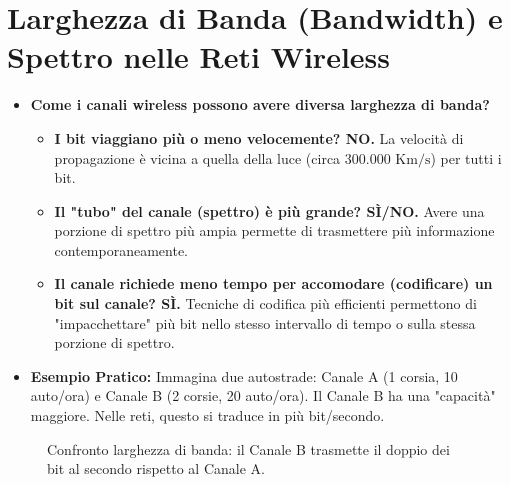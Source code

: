\section{Larghezza di Banda (Bandwidth) e Spettro nelle Reti Wireless}

\begin{itemize}
    \item \textbf{Come i canali wireless possono avere diversa larghezza di banda?}
    \begin{itemize}
        \item \textbf{I bit viaggiano più o meno velocemente? NO.} La velocità di propagazione è vicina a quella della luce (circa $300.000 \text{ Km/s}$) per tutti i bit.
        \item \textbf{Il "tubo" del canale (spettro) è più grande? SÌ/NO.} Avere una porzione di spettro più ampia permette di trasmettere più informazione contemporaneamente.
        \item \textbf{Il canale richiede meno tempo per accomodare (codificare) un bit sul canale? SÌ.} Tecniche di codifica più efficienti permettono di "impacchettare" più bit nello stesso intervallo di tempo o sulla stessa porzione di spettro.
    \end{itemize}
    \item \textbf{Esempio Pratico:}
    Immagina due autostrade: Canale A (1 corsia, 10 auto/ora) e Canale B (2 corsie, 20 auto/ora). Il Canale B ha una "capacità" maggiore. Nelle reti, questo si traduce in più bit/secondo.
\end{itemize}

\begin{figure}[H]
\centering
{}
\caption{Confronto larghezza di banda: il Canale B trasmette il doppio dei bit al secondo rispetto al Canale A.}
\label{fig:bandwidth_comparison}
\end{figure}

